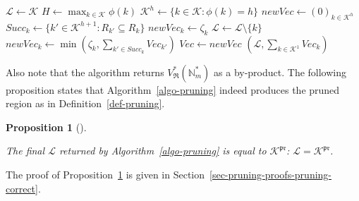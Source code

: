 \documentclass[
  11pt,
  a4paper,
]{article}
\theoremstyle{plain}
\newtheorem{proposition}{Proposition}[section]
\theoremstyle{plain}
\theoremstyle{definition}
\theoremstyle{plain}
\theoremstyle{definition}
\theoremstyle{remark}
\begin{document}
\begin{algorithm}[htb!]
\caption{\label{algo-pruning}Pruning of a complete $\mathfrak{R}$}
\begin{algorithmic}[1]
  \State $\mathcal{L}\gets\mathcal{K}$
  \State $ H \gets \max_{k\in\mathcal{K}} \phi(k)  $ 
    \State $\mathcal{K}^h\gets \{ k\in\mathcal{K} : \phi(k) =h  \}$
    \State $newVec\gets (0)_{k \in  \mathcal{K}^h}$
      \State $Succ_k \gets \{ k' \in  \mathcal{K}^{h+1} : R_{k'}\subseteq R_k\}$
        \State $newVec_k \gets \zeta_k$
      \Else
          \State $\mathcal{L}\gets \mathcal{L}\setminus \{ k \}$ 
        \EndIf
        \State $newVec_k \gets \min\left( \zeta_{k} ,  \sum_{k'\in Succ_k} Vec_{k'}   \right)$
      \EndIf
    \EndFor
    \State $Vec\gets newVec$
  \EndFor
  \State\Return $(\mathcal{L},\sum_{k\in\mathcal{K}^1} Vec_k  )$
\EndProcedure
\end{algorithmic}
\end{algorithm}

Also note that the algorithm returns
\(V^*_{\mathfrak{R}}(\mathbb{N}_m^*)\) as a by-product. The following
proposition states that Algorithm~\ref{algo-pruning} indeed produces the
pruned region as in Definition~\ref{def-pruning}.

\begin{proposition}[]\protect\hypertarget{prp-pruning-correct}{}\label{prp-pruning-correct}

The final \(\mathcal{L}\) returned by Algorithm~\ref{algo-pruning} is
equal to \(\mathcal{K}^{\mathfrak{pr}}\):
\(\mathcal{L}=\mathcal{K}^{\mathfrak{pr}}\).

\end{proposition}

The proof of Proposition~\ref{prp-pruning-correct} is given in
Section~\ref{sec-pruning-proofs-pruning-correct}.
\end{document}
